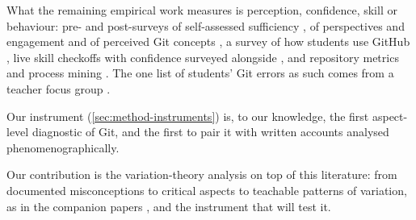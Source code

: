 What the remaining empirical work measures is perception, confidence,
skill or behaviour: pre- and post-surveys of self-assessed sufficiency
\autocite{Jabrayilzade2022InteractiveGit}, of perspectives and
engagement \autocite{Patani2024GitHubImpact} and of perceived Git
concepts \autocite{Sproull2022GitIt}, a survey of how students use
GitHub \autocite{Tiwari2022GitHubSurvey}, live skill checkoffs with
confidence surveyed alongside \autocite{McMahon2026Checkoffs}, and
repository metrics and process mining
\autocite{Hamer2021GitMetrics,Ardimento2022ProcessMining}.
The one list of students' Git errors as such comes from a teacher focus
group \autocite{Eraslan2020GitErrors}.

Our instrument (\cref{sec:method-instruments}) is, to our knowledge,
the first aspect-level diagnostic of Git, and the first to pair it with
written accounts analysed phenomenographically.

Our contribution is the variation-theory analysis on top of this literature:
from documented misconceptions to critical aspects to teachable patterns of
variation, as in the companion papers
\autocite{VTProgMisconceptions,VTDebug,VTTerminal}, and the instrument
that will test it.
